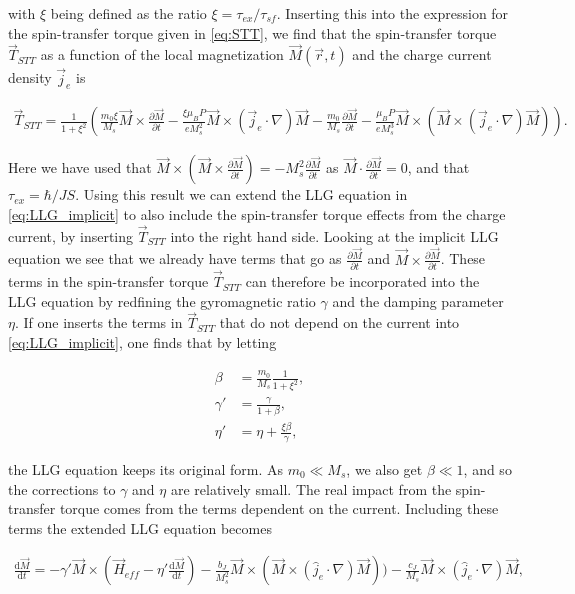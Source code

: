 \documentclass[1p]{elsarticle}		%
\numberwithin{equation}{section}
\begin{document}
with $\xi$ being defined as the ratio $\xi = \tau_{ex}/\tau_{sf}$. Inserting this into the expression for the spin-transfer torque given in \eqref{eq:STT}, we find that the spin-transfer torque $\vec{T}_{STT}$ as a function of the local magnetization $\vec{M}(\vec{r}, t)$ and the charge current density $\vec{j}_e$ is 

\begin{align}
\label{eq:STT_final}
\vec{T}_{STT} = \frac{1}{1+\xi^2}(\frac{m_0\xi}{M_s}\vec{M}\times\frac{\partial \vec{M}}{\partial t} - \frac{\xi\mu_B P}{e M_s^2}\vec{M}\times(\vec{j}_e\cdot\nabla)\vec{M} - \frac{m_0}{M_s} \frac{\partial \vec{M}}{\partial t} - \frac{\mu_B P}{e M_s^3} \vec{M}\times (\vec{M}\times(\vec{j}_e\cdot\nabla)\vec{M})).
\end{align}

Here we have used that $\vec{M}\times(\vec{M}\times\frac{\partial \vec{M}}{\partial t}) = -M_s^2\frac{\partial \vec{M}}{\partial t}$ as $\vec{M}\cdot\frac{\partial \vec{M}}{\partial t} = 0$, and that $\tau_{ex} = \hbar/JS$. Using this result we can extend the LLG equation in \eqref{eq:LLG_implicit} to also include the spin-transfer torque effects from the charge current, by inserting $\vec{T}_{STT}$ into the right hand side. Looking at the implicit LLG equation we see that we already have terms that go as $\frac{\partial \vec{M}}{\partial t}$ and $\vec{M}\times\frac{\partial \vec{M}}{\partial t}$. These terms in the spin-transfer torque $\vec{T}_{STT}$ can therefore be incorporated into the LLG equation by redfining the gyromagnetic ratio $\gamma$ and the damping parameter $\eta$. If one inserts the terms in $\vec{T}_{STT}$ that do not depend on the current into \eqref{eq:LLG_implicit}, one finds that by letting

\begin{align}
\beta &= \frac{m_0}{M_s}\frac{1}{1+\xi^2}, \\
\gamma ' &= \frac{\gamma}{1+\beta}, \\
\eta ' &= \eta + \frac{\xi\beta}{\gamma},
\end{align}

the LLG equation keeps its original form. As $m_0\ll M_s$, we also get $\beta \ll 1$, and so the corrections to $\gamma$ and $\eta$ are relatively small. The real impact from the spin-transfer torque comes from the terms dependent on the current. Including these terms the extended LLG equation becomes

\begin{align}
\label{eq:LLG_current}
\frac{\textrm{d} \vec{M}}{\textrm{d} t} = -\gamma ' \vec{M} \times (\vec{H}_{eff} - \eta '\frac{\textrm{d} \vec{M}}{\textrm{d} t}) - \frac{b_J}{M_s^2} \vec{M}\times (\vec{M}\times(\hat{j}_e\cdot\nabla)\vec{M})) - \frac{c_J}{ M_s}\vec{M}\times(\hat{j}_e\cdot\nabla)\vec{M},
\end{align}
\end{document}
